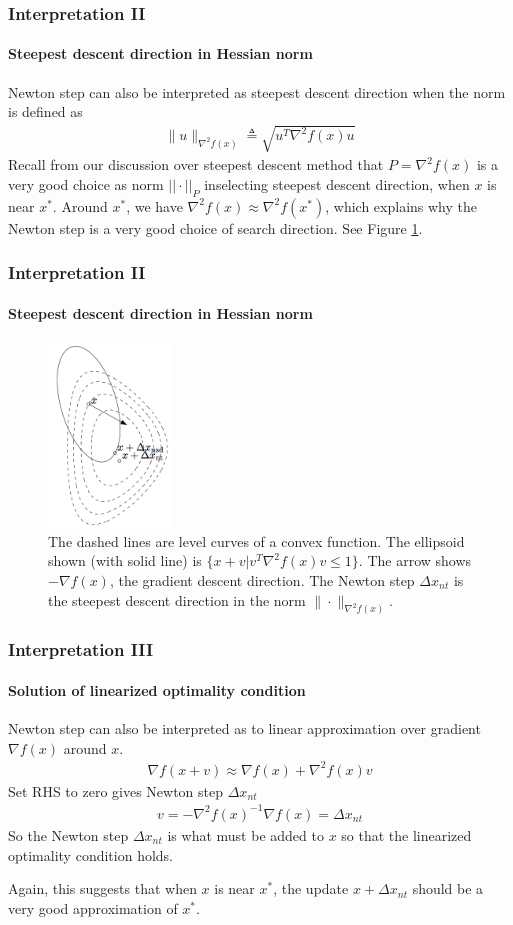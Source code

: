 \documentclass{beamer}
\newcommand{\be}{\begin{eqnarray}}
\newcommand{\ee}{\end{eqnarray}}
\begin{document}
\begin{frame}
\frametitle{Interpretation II}
\framesubtitle{Steepest descent direction in Hessian norm}
    Newton step can also be interpreted as 
    steepest descent direction when the norm is defined as
    \be
    \| u \|_{\nabla^2 f(x)} \triangleq \sqrt{u^T \nabla^2 f(x) u}
    \ee
    Recall from our discussion over steepest descent method that 
    $ P = \nabla^2 f(x)$ is a very good choice as norm $||\cdot||_P$ inselecting
    steepest descent direction, when $x$ is near $x^{*}$. Around $x^{*}$, we have $\nabla^2
    f(x) \approx \nabla^2 f(x^{*})$, which explains why the Newton step is a
    very good choice of search direction. See Figure \ref{fig:2}.
\end{frame}

\begin{frame}
\frametitle{Interpretation II}
\framesubtitle{Steepest descent direction in Hessian norm}
\begin{figure}
\includegraphics[width=1.3in]{figure/steepest.png}
\caption{ 
The dashed lines are level curves of a convex function. The ellipsoid shown
(with solid line) is $\{x + v | v^T \nabla^2 f(x) v \leq 1\}$. The arrow shows
$-\nabla f(x)$, the gradient descent direction. The Newton step $\Delta x_{nt}$ is the
steepest descent direction in the norm $\|\cdot \|_{\nabla^2 f(x)}$. 
} 
\label{fig:2}
\end{figure}
\end{frame}
\begin{frame}
\frametitle{Interpretation III}
\framesubtitle{Solution of linearized optimality condition}
    Newton step can also be interpreted as 
    to linear approximation over gradient $\nabla f(x)$ around $x$.
    \be
        \nabla f(x+v) \approx \nabla f(x) + \nabla^2 f(x) v
    \ee
    Set RHS to zero gives Newton step $\Delta x_{nt}$
    \be
        v = - \nabla^2 f(x)^{-1} \nabla f(x) = \Delta x_{nt} 
    \ee
    So the Newton step $\Delta x_{nt}$ is what must be added to $x$ so that
    the linearized optimality condition holds. 

    Again, this suggests that when $x$ is near $x^{*}$, the update $x+\Delta
    x_{nt}$ should be a very good approximation of $x^{*}$.
\end{frame}
\end{document}
